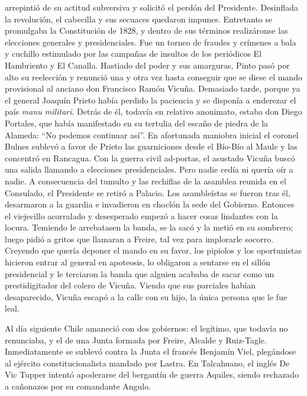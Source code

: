\documentclass[10pt,twoside,openright]{memoir}
\begin{document}
arrepintió de su actitud subversiva y solicitó el perdón del Presidente.
Desinflada la revolución, el cabecilla y sus secuaces quedaron impunes.
Entretanto se promulgaba la Constitución de 1828, y dentro de sus
términos realizáronse las elecciones generales y presidenciales. Fue un
torneo de fraudes y crímenes a bala y cuchillo estimulado por las
campañas de insultos de los periódicos El Hambriento y El Canalla.
Hastiado del poder y sus amarguras, Pinto pasó por alto su reelección y
renunció una y otra vez hasta conseguir que se diese el mando
provisional al anciano don Francisco Ramón Vicuña. Demasiado tarde,
porque ya el general Joaquín Prieto había perdido la paciencia y se
disponía a enderezar el país \emph{manu militari}. Detrás de él, todavía en
relativo anonimato, estaba don Diego Portales, que había manifestado en
su tertulia del escaño de piedra de la Alameda: ``No podemos continuar
así''. En afortunada maniobra inicial el coronel Bulnes sublevó a favor
de Prieto las guarniciones desde el Bío-Bío al Maule y las concentró en
Rancagua. Con la guerra civil ad-portas, el asustado Vicuña buscó una
salida llamando a elecciones presidenciales. Pero nadie cedía ni quería
oír a nadie. A consecuencia del tumulto y las rechiflas de la asamblea
reunida en el Consulado, el Presidente se retiró a Palacio. Los
asambleístas se fueron tras él, desarmaron a la guardia e invadieron en
choclón la sede del Gobierno. Entonces el viejecillo acorralado y
desesperado empezó a hacer cosas lindantes con la locura. Temiendo le
arrebatasen la banda, se la sacó y la metió en su sombrero; luego pidió
a gritos que llamaran a Freire, tal vez para implorarle socorro.
Creyendo que quería deponer el mando en su favor, los pipiolos y los
oportunistas hicieron entrar al general en apoteosis, lo obligaron a
sentarse en el sillón presidencial y le terciaron la banda que alguien
acababa de sacar como un prestidigitador del colero de Vicuña. Viendo
que sus parciales habían desaparecido, Vicuña escapó a la calle con su
hijo, la única persona que le fue leal.

Al día siguiente Chile amaneció con dos gobiernos: el legítimo, que
todavía no renunciaba, y el de una Junta formada por Freire, Alcalde y
Ruiz-Tagle. Inmediatamente se sublevó contra la Junta el francés
Benjamín Viel, plegándose al ejército constitucionalista mandado por
Lastra. En Talcahuano, el inglés De Vic Tupper intentó apoderarse del
bergantín de guerra Aquiles, siendo rechazado a cañonazos por su
comandante Angulo.
\end{document}

